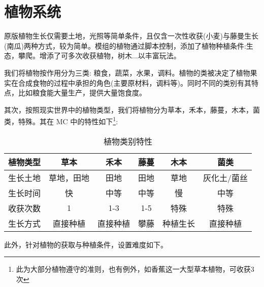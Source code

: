 \section{植物系统}

原版植物生长仅需要土地，光照等简单条件，且仅含一次性收获(小麦)与藤曼生长(南瓜)两种方式，较为简单。模组的植物通过脚本控制，添加了植物种植条件:生态，攀爬。增添了可多次收获植物，树木...以丰富玩法。

我们将植物按作用分为三类: 粮食，蔬菜，水果，调料。植物的类被决定了植物果实在合成食物的过程中承担的角色(主要原材料，调料等)。同时不同的类别有其特点，比如粮食能大量生产，提供大量饱食度。

其次，按照现实世界中的植物类型，我们将植物分为草本，禾本，藤蔓，木本，菌类，特殊。其在 MC 中的特性如下\footnote{此为大部分植物遵守的准则，也有例外，如香蕉这一大型草本植物，可收获3次}:

\begin{table}[H]
    \centering
    \caption{植物类别特性}
    \label{table:植物类别特性}
    \setlength{\tabcolsep}{4mm}
    \begin{tabular}{c|ccccc}
        \toprule
        \textbf{植物类型} & \textbf{草本} & \textbf{禾本} & \textbf{藤蔓} & \textbf{木本} & \textbf{菌类} \\
        \midrule
        生长土地          & 草地，田地    & 田地          & 田地          & 草地          & 灰化土/菌丝        \\
        生长时间          & 快            & 中等          & 中等          & 慢            & 中等          \\
        收获次数          & 1             & 1-3           & 1-5           & 特殊          & 特殊          \\
        生长方式          & 直接种植      & 直接种植      & 攀藤          & 种植生长      & 直接种植      \\
        \bottomrule
    \end{tabular}
\end{table}

此外，针对植物的获取与种植条件，设置难度如下。


